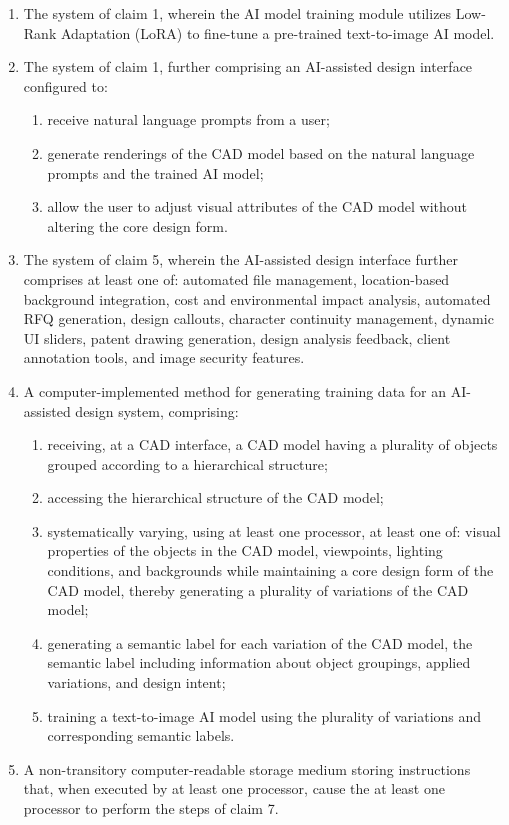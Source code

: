 \documentclass[12pt]{article}
\begin{document}
\begin{itemize}
\begin{enumerate}
\item The system of claim 1, wherein the AI model training module utilizes Low-Rank Adaptation (LoRA) to fine-tune a pre-trained text-to-image AI model.

\item The system of claim 1, further comprising an AI-assisted design interface configured to:
    \begin{enumerate}
        \item receive natural language prompts from a user;
        \item generate renderings of the CAD model based on the natural language prompts and the trained AI model;
        \item allow the user to adjust visual attributes of the CAD model without altering the core design form.
    \end{enumerate}

\item The system of claim 5, wherein the AI-assisted design interface further comprises at least one of: automated file management, location-based background integration, cost and environmental impact analysis, automated RFQ generation, design callouts, character continuity management, dynamic UI sliders, patent drawing generation, design analysis feedback, client annotation tools, and image security features.

\item A computer-implemented method for generating training data for an AI-assisted design system, comprising:
    \begin{enumerate}
        \item receiving, at a CAD interface, a CAD model having a plurality of objects grouped according to a hierarchical structure;
        \item accessing the hierarchical structure of the CAD model;
        \item systematically varying, using at least one processor, at least one of: visual properties of the objects in the CAD model, viewpoints, lighting conditions, and backgrounds while maintaining a core design form of the CAD model, thereby generating a plurality of variations of the CAD model;
        \item generating a semantic label for each variation of the CAD model, the semantic label including information about object groupings, applied variations, and design intent;
        \item training a text-to-image AI model using the plurality of variations and corresponding semantic labels.
    \end{enumerate}

\item A non-transitory computer-readable storage medium storing instructions that, when executed by at least one processor, cause the at least one processor to perform the steps of claim 7. 

\end{enumerate}
\end{itemize} %
\end{document}
